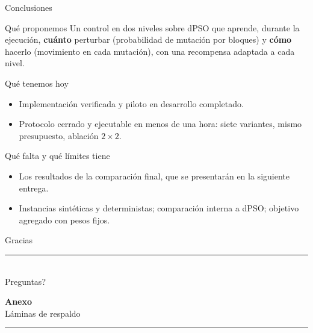 \documentclass[aspectratio=169,11pt]{beamer}
\begin{document}
\begin{frame}{Conclusiones}
  \begin{block}{Qué proponemos}
    \small
    Un control en dos niveles sobre dPSO que aprende, durante la ejecución, \textbf{cuánto} perturbar (probabilidad de mutación por bloques) y \textbf{cómo} hacerlo (movimiento en cada mutación), con una recompensa adaptada a cada nivel.
  \end{block}

  \begin{exampleblock}{Qué tenemos hoy}
    \small
    \begin{itemize}
      \item Implementación verificada y piloto en desarrollo completado.
      \item Protocolo cerrado y ejecutable en menos de una hora: siete variantes, mismo presupuesto, ablación $2\times2$.
    \end{itemize}
  \end{exampleblock}

  \begin{alertblock}{Qué falta y qué límites tiene}
    \small
    \begin{itemize}
      \item Los resultados de la comparación final, que se presentarán en la siguiente entrega.
      \item Instancias sintéticas y deterministas; comparación interna a dPSO; objetivo agregado con pesos fijos.
    \end{itemize}
  \end{alertblock}
\end{frame}

\begin{frame}[plain]
  \centering
  \vfill
  {\color{primary}Gracias}\\[0.6em]
  {\color{accent}\rule{4.2cm}{2.2pt}}\\[1.0em]
  {\large \textquestiondown{}Preguntas?}
  \vfill
\end{frame}

\appendix

\begin{frame}[plain]
  \centering
  \vfill
  {\color{accent}\bfseries\large Anexo}\\[0.5em]
  {\color{primary}Láminas de respaldo}\\[0.6em]
  {\color{accent}\rule{4.2cm}{2.2pt}}
  \vfill
\end{frame}
\end{document}
